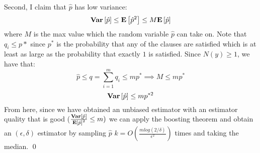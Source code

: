 \documentclass[12pt]{article}
\begin{document}
\begin{solution}
Second, I claim that $\hat{p}$ has low variance:
\[
\mathbf{Var}\left[\hat{p}\right] \leq \mathbf{E}\left[\hat{p}^2\right] \leq M\mathbf{E}\left[\hat{p}\right]
\]
where $M$ is the max value which the random variable $\hat{p}$ can take on. Note that $q_i \leq p*$ since $p^*$ is the probability that any of the clauses are satisfied which is at least as large as the probability that exactly $1$ is satisfied. Since $N(y) \geq 1$, we have that:
\[
\hat{p} \leq q = \sum_{i=1}^{m}{q_i} \leq mp^* \implies M \leq mp^*
\]
\[
\mathbf{Var}\left[\hat{p}\right] \leq mp^{*2}
\]
From here, since we have obtained an unbiased estimator with an estimator quality that is good ($\frac{\mathbf{Var}\left[\hat{p}\right]}{\mathbf{E}\left[\hat{p}\right]^2} \leq m)$ we can apply the boosting theorem and obtain an $(\epsilon,\delta)$ estimator by sampling $\hat{p}$ $k = O(\frac{m log(2/\delta)}{\epsilon^2})$ times and taking the median. \qed
\end{solution}
\end{document}
